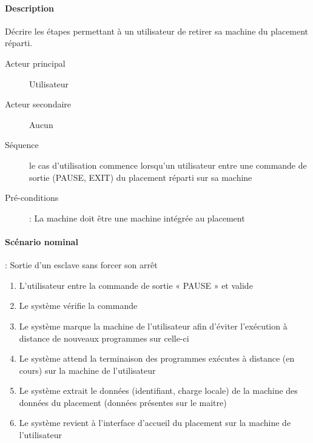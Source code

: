     \paragraph{Description}Décrire les étapes permettant à un 
      utilisateur de retirer sa machine du placement réparti.
      \begin{description}
        \item[Acteur principal] Utilisateur
        \item[Acteur secondaire] Aucun
        \item[Séquence] le cas d'utilisation commence lorsqu'un 
          utilisateur entre une commande de sortie (PAUSE, EXIT) du
          placement réparti sur sa machine
        \item[Pré-conditions] : La machine doit être une machine intégrée au placement
    \end{description}
    \paragraph{Scénario nominal} : Sortie d'un esclave sans forcer son arrêt
        \begin{enumerate}
          \item L'utilisateur entre la commande de sortie « PAUSE » et valide
          \item Le système vérifie la commande
          \item Le système marque la machine de l'utilisateur afin d'éviter l'exécution à distance de
              nouveaux programmes sur celle-ci
          \item Le système attend la terminaison des programmes exécutes à distance (en cours) sur la
              machine de l'utilisateur
          \item Le système extrait le données (identifiant, charge locale) de la machine des données du
              placement (données présentes sur le maitre)
          \item Le système revient à l'interface d'accueil du placement sur la machine de l'utilisateur
        \end{enumerate}
